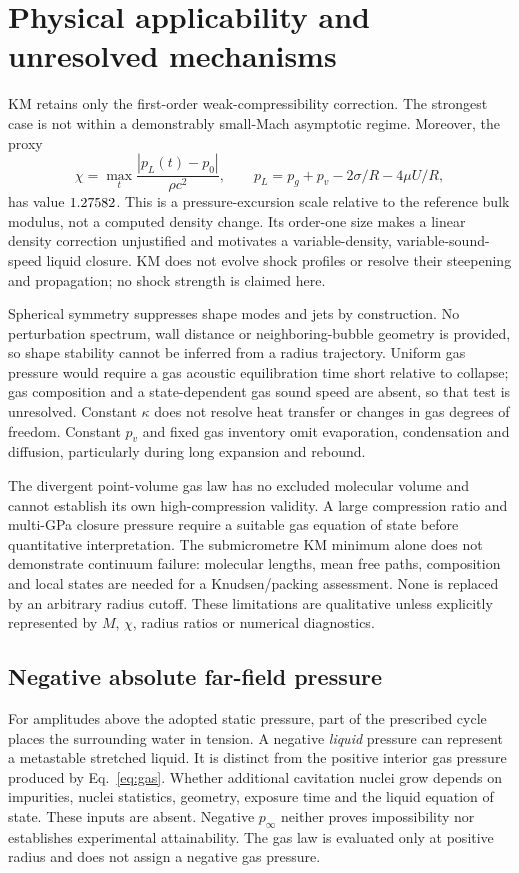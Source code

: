 \documentclass[10pt,a4paper]{article}
\begin{document}
\section{Physical applicability and unresolved mechanisms}
KM retains only the first-order weak-compressibility correction. The strongest case is not within a demonstrably small-Mach asymptotic regime. Moreover, the proxy
\[
 \chi=\max_t\frac{|p_L(t)-p_0|}{\rho c^2},\qquad
 p_L=p_g+p_v-2\sigma/R-4\mu U/R,
\]
has value $1.27582$. This is a pressure-excursion scale relative to the reference bulk modulus, not a computed density change. Its order-one size makes a linear density correction unjustified and motivates a variable-density, variable-sound-speed liquid closure. KM does not evolve shock profiles or resolve their steepening and propagation; no shock strength is claimed here.

Spherical symmetry suppresses shape modes and jets by construction. No perturbation spectrum, wall distance or neighboring-bubble geometry is provided, so shape stability cannot be inferred from a radius trajectory. Uniform gas pressure would require a gas acoustic equilibration time short relative to collapse; gas composition and a state-dependent gas sound speed are absent, so that test is unresolved. Constant $\kappa$ does not resolve heat transfer or changes in gas degrees of freedom. Constant $p_v$ and fixed gas inventory omit evaporation, condensation and diffusion, particularly during long expansion and rebound.

The divergent point-volume gas law has no excluded molecular volume and cannot establish its own high-compression validity. A large compression ratio and multi-GPa closure pressure require a suitable gas equation of state before quantitative interpretation. The submicrometre KM minimum alone does not demonstrate continuum failure: molecular lengths, mean free paths, composition and local states are needed for a Knudsen/packing assessment. None is replaced by an arbitrary radius cutoff. These limitations are qualitative unless explicitly represented by $M$, $\chi$, radius ratios or numerical diagnostics.

\subsection{Negative absolute far-field pressure}
For amplitudes above the adopted static pressure, part of the prescribed cycle places the surrounding water in tension. A negative \emph{liquid} pressure can represent a metastable stretched liquid. It is distinct from the positive interior gas pressure produced by Eq.~\eqref{eq:gas}. Whether additional cavitation nuclei grow depends on impurities, nuclei statistics, geometry, exposure time and the liquid equation of state. These inputs are absent. Negative $p_\infty$ neither proves impossibility nor establishes experimental attainability. The gas law is evaluated only at positive radius and does not assign a negative gas pressure.
\end{document}
